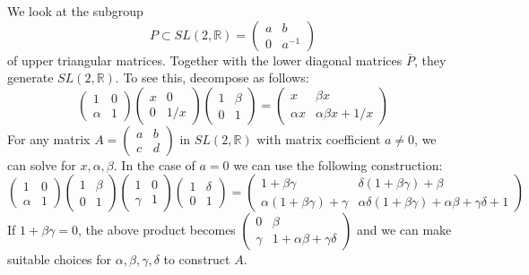 \documentclass[
  12pt
]{article}
\theoremstyle{break}
\theoremstyle{plain}
\begin{document}
  We look at the subgroup
  \[P \subset SL(2, \mathbb{R}) = \begin{pmatrix}a & b \\ 0 & a^{-1}\end{pmatrix}\]
  of upper triangular matrices. Together with the lower diagonal matrices
  $\bar{P}$, they generate $SL(2, \mathbb{R})$. To see this, decompose
  as follows: \[\begin{pmatrix}1&0\\\alpha&1\end{pmatrix}
  \begin{pmatrix}x&0\\0&1/x\end{pmatrix}
  \begin{pmatrix}1&\beta\\0&1\end{pmatrix} = 
  \begin{pmatrix} x&\beta x\\\alpha x& \alpha\beta x+1/x\end{pmatrix}\]
  For any matrix $A = \begin{pmatrix}a & b \\ c & d\end{pmatrix}$ in
  $SL(2, \mathbb{R})$ with matrix coefficient $a \neq 0$, we can solve
  for $x,\alpha, \beta$. In the case of $a = 0$ we can use the
  following construction:
  \[
    \begin{pmatrix} 1&0\\\alpha&1\end{pmatrix}
    \begin{pmatrix} 1&\beta\\0&1\end{pmatrix}
    \begin{pmatrix} 1&0\\\gamma&1\end{pmatrix}
    \begin{pmatrix} 1&\delta\\0&1\end{pmatrix}=
    \begin{pmatrix}
      1+\beta\gamma&\delta(1+\beta\gamma)+\beta\\
      \alpha(1+\beta\gamma)+\gamma&\alpha\delta(1+\beta\gamma)+\alpha\beta+\gamma\delta+1
    \end{pmatrix}
  \]
  If $1 + \beta\gamma = 0$, the above product becomes
  $\begin{pmatrix} 0&\beta\\ \gamma& 1+\alpha\beta+\gamma\delta \end{pmatrix}$
  and we can make suitable choices for $\alpha, \beta, \gamma, \delta$
  to construct $A$.
\end{document}
